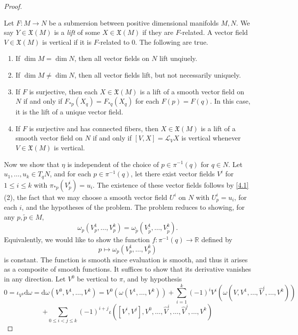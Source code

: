 \documentclass[10pt, letterpaper]{article}
\begin{document}
\begin{proof}
	\begin{proposition}[Lee 8.18]\label{4.1}
		Let $F : M \to N$ be a submersion between positive dimensional manifolds $M,N$. We say $Y\in \mathfrak{X} (M)$ is a \emph{lift} of some $X\in \mathfrak{X} (M)$ if they are $F$-related. A vector field $V\in \mathfrak{X} (M)$ is vertical if it is $F$-related to 0. The following are true.
		\begin{enumerate}
			\item If $\dim M = \dim N$, then all vector fields on $N$ lift unqiuely.
			\item If $\dim M \neq \dim N$, then all vector fields lift, but not necessarily uniquely.
			\item If $F$ is surjective, then each $X\in \mathfrak{X} (M)$ is a lift of a smooth vector field on $N$ if and only if $F_{*p} (X_q)=F_{*q} (X_q)$ for each $F(p)=F(q)$. In this case, it is the lift of a unique vector field.
			\item If $F$ is surjective and has connected fibers, then $X\in \mathfrak{X} (M)$ is a lift of a smooth vector field on $N$ if and only if $[V,X]=\mathcal{L} _VX$ is vertical whenever $V\in \mathfrak{X} (M)$ is vertical.
		\end{enumerate}
	\end{proposition}
	Now we show that $\eta $ is independent of the choice of $p\in \pi ^{-1} (q)$ for $q\in N$. Let $u_1, \ldots , u_k\in T_qN$, and for each $p\in \pi ^{-1} (q)$, let there exist vector fields $V^i$ for $1\leq i\leq k$ with $\pi _{*p} (V^i_p)=u_i$. The existence of these vector fields follows by \cref{4.1} (2), the fact that we may choose a smooth vector field $U^i$ on $N$ with $U^i_p=u_i$, for each $i$, and the hypotheses of the problem. The problem reduces to showing, for any $p,\widetilde{p} \in M$,
	\[
		\omega _{p} (V_p^1, \ldots ,V_p^k) = \omega _{\widetilde{p} } (V^1_{\widetilde{p} } , \ldots , V^k_{\widetilde{p} } )
	.\]
	Equivalently, we would like to show the function $f:\pi ^{-1} (q)\to \mathbb{R} $ defined by
	\[
		p\mapsto \omega _p(V^1_p, \ldots ,V^k_p)
	\]
	is constant. The function is smooth since evaluation is smooth, and thus it arises as a composite of smooth functions. It suffices to show that its derivative vanishes in any direction. Let $V^0$ be vertical to $\pi $, and by hypothesis
	\[
		0=\iota _{V^0}\mathrm{d} \omega =\mathrm{d} \omega (V^0,V^1, \ldots ,V^k)=V^0(\omega (V^1, \ldots ,V^k))+\sum_{i=1}^{k} (-1)^iV^i(\omega (V,V^1, \ldots , \hat{V} ^i, \ldots ,V^k))
	\]
	\[
		+\sum_{0\leq i<j\leq k} (-1)^{i+j} \iota ([V^i,V^j],V^0, \ldots , \hat{V} ^i, \ldots ,\hat{V} ^j, \ldots ,V^k)
\]
\end{proof}
\end{document}
